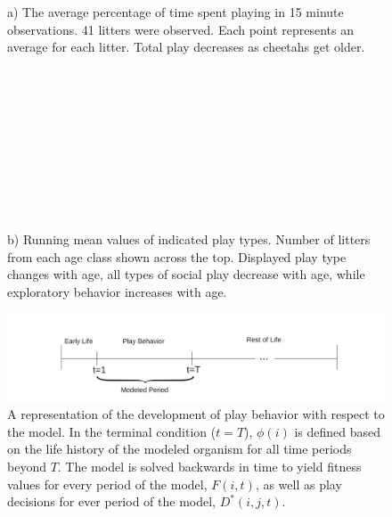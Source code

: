 \begin{figure}
\begin{center}
\begin{minipage}[t]{0.48\linewidth}
       \\\\a) The average percentage of time spent playing in 15 minute observations. 41 litters were observed. Each point represents an average for each litter. Total play decreases as cheetahs get older. 
       \\\\\\\\\\\\\\\\\\\\\\b) Running mean values of indicated play types. Number of litters from each age class shown across the top. Displayed play type changes with age, all types of social play decrease with age, while exploratory behavior increases with age. 
    \end{minipage}
  \end{center}
\end{figure}



\begin{figure}[h]
\caption{A representation of the development of play behavior with respect to the model. In the terminal condition ($t=T$), $\phi(i)$ is defined based on the life history of the modeled organism for all time periods beyond $T$. The model is solved backwards in time to yield fitness values for every period of the model, $F(i,t)$, as well as play decisions for ever period of the model, $D^*(i,j,t)$.}
\begin{center}
\includegraphics[width=170mm]{numberLineOfLife.pdf}
\end{center}
\label{sdf}
\end{figure}



